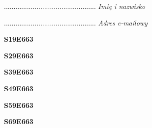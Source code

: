 \begin{turn}{90}\begin{minipage}{\linewidth} \vspace{20mm} ................................................  \textit{Imię i nazwisko}\end{minipage}\end{turn}

\begin{turn}{90}\begin{minipage}{\linewidth} \vspace{20mm} ................................................  \textit{Adres e-mailowy}\end{minipage}\end{turn}

\begin{turn}{90}\huge \begin{minipage}{\linewidth} \vspace{10mm}\textbf{S19E663}\end{minipage}\end{turn}

\begin{turn}{90}\huge \begin{minipage}{\linewidth} \vspace{10mm}\textbf{S29E663}\end{minipage}\end{turn}

\begin{turn}{90}\huge \begin{minipage}{\linewidth} \vspace{10mm}\textbf{S39E663}\end{minipage}\end{turn}

\begin{turn}{90}\huge \begin{minipage}{\linewidth} \vspace{10mm}\textbf{S49E663}\end{minipage}\end{turn}

\begin{turn}{90}\huge \begin{minipage}{\linewidth} \vspace{10mm}\textbf{S59E663}\end{minipage}\end{turn}

\begin{turn}{90}\huge \begin{minipage}{\linewidth} \vspace{10mm}\textbf{S69E663}\end{minipage}\end{turn}

